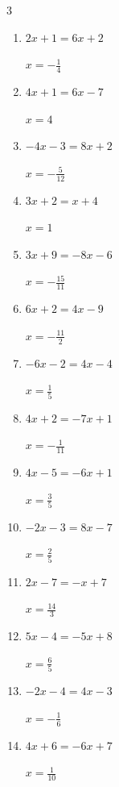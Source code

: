 \begin{multicols}{3}
\begin{enumerate}
        $\displaystyle x=4$

  \item $2x+1=6x+2$

        $\displaystyle x=-\frac{1}{4}$

  \item $4x+1=6x-7$

        $\displaystyle x=4$

  \item $-4x-3=8x+2$

        $\displaystyle x=-\frac{5}{12}$

\columnbreak %

  \item $3x+2=x+4$

        $\displaystyle x=1$

  \item $3x+9=-8x-6$

        $\displaystyle x=-\frac{15}{11}$

  \item $6x+2=4x-9$

        $\displaystyle x=-\frac{11}{2}$

  \item $-6x-2=4x-4$

        $\displaystyle x=\frac{1}{5}$

  \item $4x+2=-7x+1$

        $\displaystyle x=-\frac{1}{11}$

  \item $4x-5=-6x+1$

        $\displaystyle x=\frac{3}{5}$

  \item $-2x-3=8x-7$

        $\displaystyle x=\frac{2}{5}$

  \item $2x-7=-x+7$

        $\displaystyle x=\frac{14}{3}$

  \item $5x-4=-5x+8$

        $\displaystyle x=\frac{6}{5}$

  \item $-2x-4=4x-3$

        $\displaystyle x=-\frac{1}{6}$

  \item $4x+6=-6x+7$

        $\displaystyle x=\frac{1}{10}$


\end{enumerate}
\end{multicols}
